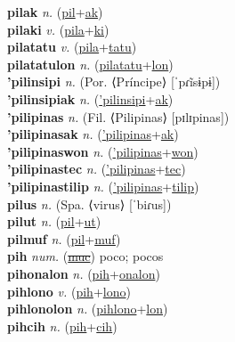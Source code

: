 \textbf{pilak} \textit{n.} (\hyperref[pil]{pil}+\hyperref[ak]{ak})
 \label{pilak} \\
\textbf{pilaki} \textit{v.} (\hyperref[pila]{pila}+\hyperref[ki]{ki})
 \label{pilaki} \\
\textbf{pilatatu} \textit{v.} (\hyperref[pila]{pila}+\hyperref[tatu]{tatu})
 \label{pilatatu} \\
\textbf{pilatatulon} \textit{n.} (\hyperref[pilatatu]{pilatatu}+\hyperref[lon]{lon})
 \label{pilatatulon} \\
\textbf{'pilinsipi} \textit{n.} (Por. ⟨Príncipe⟩ [ˈpɾĩsɨpɨ])
 \label{'pilinsipi} \\
\textbf{'pilinsipiak} \textit{n.} (\hyperref['pilinsipi]{'pilinsipi}+\hyperref[ak]{ak})
 \label{'pilinsipiak} \\
\textbf{'pilipinas} \textit{n.} (Fil. ⟨Pilipinas⟩ [pɪlɪpinas])
 \label{'pilipinas} \\
\textbf{'pilipinasak} \textit{n.} (\hyperref['pilipinas]{'pilipinas}+\hyperref[ak]{ak})
 \label{'pilipinasak} \\
\textbf{'pilipinaswon} \textit{n.} (\hyperref['pilipinas]{'pilipinas}+\hyperref[won]{won})
 \label{'pilipinaswon} \\
\textbf{'pilipinastec} \textit{n.} (\hyperref['pilipinas]{'pilipinas}+\hyperref[tec]{tec})
 \label{'pilipinastec} \\
\textbf{'pilipinastilip} \textit{n.} (\hyperref['pilipinas]{'pilipinas}+\hyperref[tilip]{tilip})
 \label{'pilipinastilip} \\
\textbf{pilus} \textit{n.} (Spa. ⟨virus⟩ [ˈbiɾus])
 \label{pilus} \\
\textbf{pilut} \textit{n.} (\hyperref[pil]{pil}+\hyperref[ut]{ut})
 \label{pilut} \\
\textbf{pilmuf} \textit{n.} (\hyperref[pil]{pil}+\hyperref[muf]{muf})
 \label{pilmuf} \\
\textbf{pih} \textit{num.} (\hyperref[muc]{\sout{muc}})
poco; pocos \label{pih} \\
\textbf{pihonalon} \textit{n.} (\hyperref[pih]{pih}+\hyperref[onalon]{onalon})
 \label{pihonalon} \\
\textbf{pihlono} \textit{v.} (\hyperref[pih]{pih}+\hyperref[lono]{lono})
 \label{pihlono} \\
\textbf{pihlonolon} \textit{n.} (\hyperref[pihlono]{pihlono}+\hyperref[lon]{lon})
 \label{pihlonolon} \\
\textbf{pihcih} \textit{n.} (\hyperref[pih]{pih}+\hyperref[cih]{cih})
 \label{pihcih} \\
